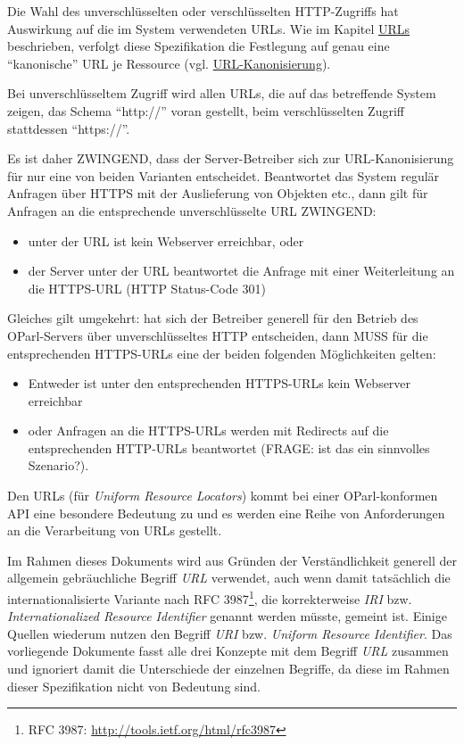 \documentclass[,a4paper]{article}
\begin{document}
Die Wahl des unverschlüsselten oder verschlüsselten HTTP-Zugriffs hat
Auswirkung auf die im System verwendeten URLs. Wie im Kapitel
\hyperref[urls]{URLs} beschrieben, verfolgt diese Spezifikation die
Festlegung auf genau eine ``kanonische'' URL je Ressource (vgl.
\hyperref[urlux5fkanonisierung]{URL-Kanonisierung}).

Bei unverschlüsseltem Zugriff wird allen URLs, die auf das betreffende
System zeigen, das Schema ``http://'' voran gestellt, beim
verschlüsselten Zugriff stattdessen ``https://''.

Es ist daher ZWINGEND, dass der Server-Betreiber sich zur
URL-Kanonisierung für nur eine von beiden Varianten entscheidet.
Beantwortet das System regulär Anfragen über HTTPS mit der Auslieferung
von Objekten etc., dann gilt für Anfragen an die entsprechende
unverschlüsselte URL ZWINGEND:

\begin{itemize}
\item
  unter der URL ist kein Webserver erreichbar, oder
\item
  der Server unter der URL beantwortet die Anfrage mit einer
  Weiterleitung an die HTTPS-URL (HTTP Status-Code 301)
\end{itemize}

Gleiches gilt umgekehrt: hat sich der Betreiber generell für den Betrieb
des OParl-Servers über unverschlüsseltes HTTP entscheiden, dann MUSS für
die entsprechenden HTTPS-URLs eine der beiden folgenden Möglichkeiten
gelten:

\begin{itemize}
\item
  Entweder ist unter den entsprechenden HTTPS-URLs kein Webserver
  erreichbar
\item
  oder Anfragen an die HTTPS-URLs werden mit Redirects auf die
  entsprechenden HTTP-URLs beantwortet (FRAGE: ist das ein sinnvolles
  Szenario?).
\end{itemize}


Den URLs (für \emph{Uniform Resource Locators}) kommt bei einer
OParl-konformen API eine besondere Bedeutung zu und es werden eine Reihe
von Anforderungen an die Verarbeitung von URLs gestellt.

Im Rahmen dieses Dokuments wird aus Gründen der Verständlichkeit
generell der allgemein gebräuchliche Begriff \emph{URL} verwendet, auch
wenn damit tatsächlich die internationalisierte Variante nach RFC
3987\footnote{RFC 3987: \url{http://tools.ietf.org/html/rfc3987}}, die
korrekterweise \emph{IRI} bzw. \emph{Internationalized Resource
Identifier} genannt werden müsste, gemeint ist. Einige Quellen wiederum
nutzen den Begriff \emph{URI} bzw. \emph{Uniform Resource Identifier}.
Das vorliegende Dokumente fasst alle drei Konzepte mit dem Begriff
\emph{URL} zusammen und ignoriert damit die Unterschiede der einzelnen
Begriffe, da diese im Rahmen dieser Spezifikation nicht von Bedeutung
sind.
\end{document}
